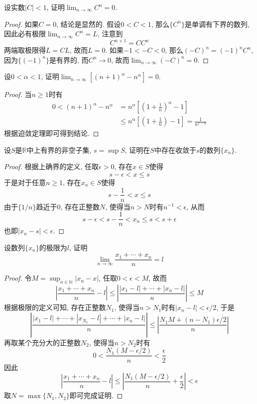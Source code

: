 \documentclass[cn,12pt,math=mtpro2,citestyle=gb7714-2015,bibstyle=gb7714-2015,twocol]{elegantbook}
\newcommand{\R}{\mathbb{R}}
\newcommand{\limn }{\lim_{n\to\infty}}
\begin{document}
\begin{example}
设实数$|C|<1$, 证明$\limn C^n=0$.
\end{example}
\begin{proof}
  如果$C=0$, 结论是显然的. 假设$0<C<1$, 那么$\{C^n\}$是单调有下界的数列, 因此必有极限$\limn C^n=L$, 注意到
  $$C^{n+1}=CC^n$$
  两端取极限得$L=CL$, 故而$L=0$. 如果$-1<-C<0$, 那么$(-C)^n=(-1)^nC^n$, 因为$\{(-1)^n\}$是有界的, 而$C^n\to0$, 故而$\limn (-C)^n=0$.
\end{proof}

\begin{example}
设$0<\alpha<1$, 证明$\limn [(n+1)^\alpha-n^\alpha]=0$.
\end{example}
\begin{proof}
  当$n\ge1$时有
  \begin{align*}
  0<(n+1)^\alpha-n^\alpha&=n^\alpha\left[\left(1+\frac{1}{n}\right)^\alpha-1\right] \\
  &\leq n^\alpha\left[\left(1+\frac{1}{n}\right)-1\right]=\frac{1}{n^{1-\alpha}}
  \end{align*}
  根据迫敛定理即可得到结论.
\end{proof}

\begin{example}
设$S$是$\R$中上有界的非空子集, $s=\sup S$, 证明在$S$中存在收敛于$s$的数列$\{x_n\}$.
\end{example}
\begin{proof}
  根据上确界的定义, 任取$\epsilon>0$, 存在$x\in S$使得
  $$s-\epsilon<x\leq s$$
  于是对于任意$n\ge1$, 存在$x_n\in S$使得
  $$s-\frac{1}{n}<x\leq s$$
  由于$\{1/n\}$趋近于0, 存在正整数$N$, 使得当$n>N$时有$n^{-1}<\epsilon$, 从而
  $$s-\epsilon<s-\frac{1}{n}<x_n\leq s<s+\epsilon$$
  也即$|x_n-s|<\epsilon$.
\end{proof}

\begin{example}[$\,$Cesaro均值]
设数列$\{x_n\}$的极限为$l$, 证明
$$\limn \frac{x_1+\cdots+x_n}{n}=l$$
\end{example}
\begin{proof}
  令$M=\sup_{n\in\mathbb{N}}|x_n-x|$, 任取$0<\epsilon<M$, 故而
  $$\left|\frac{x_1+\cdots+x_n}{n}-l\right|\leq \left|\frac{|x_1-l|+\cdots+|x_n-l|}{n}\right|\leq M$$
  根据极限的定义可知, 存在正整数$N_1$, 使得当$n>N_1$时有$|x_n-l|<\epsilon/2$, 于是
  $$\left|\frac{|x_1-l|+\cdots+|x_{N_1}-l|+\cdots+|x_n-l|}{n}\right|\leq \left|\frac{N_1M+(n-N_1)\epsilon/2}{n}\right|$$
  再取某个充分大的正整数$N_2$, 使得当$n>N_2$时有
  $$0<\frac{N_1(M-\epsilon/2)}{n}<\frac{\epsilon}{2}$$
  因此
  $$\left|\frac{x_1+\cdots+x_n}{n}-l\right|\leq \left|\frac{N_1(M-\epsilon/2)}{n}+\frac{\epsilon}{2}\right|<\epsilon$$
  取$N=\max\{N_1,N_2\}$即可完成证明.
\end{proof}
\end{document}
